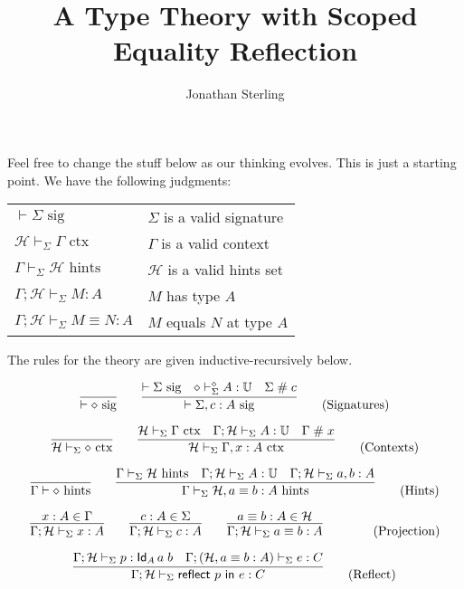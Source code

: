 \documentclass{amsart}
\title{A Type Theory with Scoped Equality Reflection}
\author{Jonathan Sterling}
\begin{document}
\maketitle

\def\emp{\diamond}
\def\sig{\mbox{ sig}}
\def\ctx{\mbox{ ctx}}
\def\hints{\mbox{ hints}}
\def\fresh{\mathrel{\#}}

Feel free to change the stuff below as our thinking evolves. This is just a
starting point. We have the following judgments:

\bigskip
\begin{tabular}{ll}
$\vdash\Sigma\sig$                            & $\Sigma$ is a valid signature\\
$\mathcal{H}\vdash_\Sigma\Gamma\ctx$          & $\Gamma$ is a valid context\\
$\Gamma\vdash_\Sigma\mathcal{H}\hints$        & $\mathcal{H}$ is a valid hints set\\
$\Gamma;\mathcal{H}\vdash_\Sigma M:A$         & $M$ has type $A$\\
$\Gamma;\mathcal{H}\vdash_\Sigma M\equiv N:A$ & $M$ equals $N$ at type $A$
\end{tabular}
\bigskip

\noindent
The rules for the theory are given inductive-recursively below.

\begin{equation}
  \infer{\vdash\emp\sig}{}
  \qquad
  \infer{
    \vdash\Sigma,c:A\sig
  }{
    \vdash\Sigma\sig &
    \emp\vdash_\Sigma^\emp A:\mathbb{U} &
    \Sigma\fresh c
  }
  \tag{Signatures}
\end{equation}

\begin{equation}
  \infer{\mathcal{H}\vdash_\Sigma\emp\ctx}{}
  \qquad
  \infer{
    \mathcal{H}\vdash_\Sigma\Gamma,x:A\ctx
  }{
    \mathcal{H}\vdash_\Sigma\Gamma\ctx &
    \Gamma;\mathcal{H}\vdash_\Sigma A:\mathbb{U} &
    \Gamma\fresh x
  }
  \tag{Contexts}
\end{equation}

\begin{equation}
  \infer{\Gamma\vdash \emp\hints}{}
  \qquad
  \infer{
    \Gamma\vdash_\Sigma \mathcal{H}, a\equiv b:A\hints
  }{
    \Gamma\vdash_\Sigma \mathcal{H}\hints &
    \Gamma;\mathcal{H}\vdash_\Sigma A: \mathbb{U} &
    \Gamma;\mathcal{H}\vdash_\Sigma a,b : A
  }
  \tag{Hints}
\end{equation}

\begin{equation}
  \infer{
    \Gamma;\mathcal{H}\vdash_\Sigma x:A
  }{
    x:A\in\Gamma
  }
  \qquad
  \infer{
    \Gamma;\mathcal{H}\vdash_\Sigma c:A
  }{
    c:A\in\Sigma
  }
  \qquad
  \infer{
    \Gamma;\mathcal{H}\vdash_\Sigma a\equiv b:A
  }{
    a\equiv b:A \in \mathcal{H}
  }
  \qquad
  \tag{Projection}
\end{equation}

\begin{equation}
  \infer{
    \Gamma;\mathcal{H}\vdash_\Sigma \mathsf{reflect}\ p\ \mathsf{in}\ e : C
  }{
    \Gamma;\mathcal{H}\vdash_\Sigma p : \mathsf{Id}_A\,a\;b &
    \Gamma;(\mathcal{H}, a\equiv b:A)\vdash_\Sigma e : C
  }
  \tag{Reflect}
\end{equation}
\end{document}
